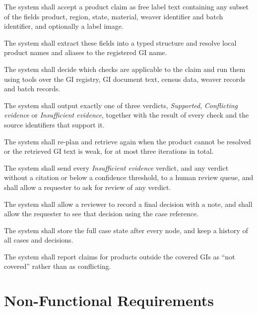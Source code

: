 \begin{description}[leftmargin=1.6cm,style=nextline,itemsep=2pt]
\item[FR1] The system shall accept a product claim as free label text containing any subset of the
fields product, region, state, material, weaver identifier and batch identifier, and optionally a
label image.
\item[FR2] The system shall extract these fields into a typed structure and resolve local product
names and aliases to the registered GI name.
\item[FR3] The system shall decide which checks are applicable to the claim and run them using tools
over the GI registry, GI document text, census data, weaver records and batch records.
\item[FR4] The system shall output exactly one of three verdicts, \emph{Supported}, \emph{Conflicting
evidence} or \emph{Insufficient evidence}, together with the result of every check and the source
identifiers that support it.
\item[FR5] The system shall re-plan and retrieve again when the product cannot be resolved or the
retrieved GI text is weak, for at most three iterations in total.
\item[FR6] The system shall send every \emph{Insufficient evidence} verdict, and any verdict without a
citation or below a confidence threshold, to a human review queue, and shall allow a requester to ask
for review of any verdict.
\item[FR7] The system shall allow a reviewer to record a final decision with a note, and shall allow
the requester to see that decision using the case reference.
\item[FR8] The system shall store the full case state after every node, and keep a history of all
cases and decisions.
\item[FR9] The system shall report claims for products outside the covered GIs as ``not covered''
rather than as conflicting.
\end{description}

\section{Non-Functional Requirements}

